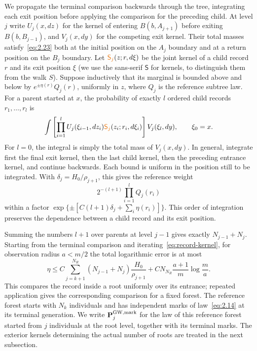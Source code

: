 \documentclass[11pt,letterpaper,reqno]{amsart}
\newif\ifrevmarks \revmarkstrue
\newcommand{\add}[1]{\ifrevmarks\textcolor{revorange}{#1}\else#1\fi}
\newcommand{\ren}[2]{\add{#2}}%
\numberwithin{equation}{section}
\theoremstyle{remark}
\begin{document}
We propagate the terminal comparison backwards through the tree, integrating each exit position before applying the comparison for the preceding child. At level $j$ write $U_j(x,dz)$ for the kernel of entering $B(b,A_{j+1})$ before exiting $B(b,B_{j-1})$, and $V_j(x,dy)$ for the competing exit kernel. Their total masses satisfy~\eqref{eq:2.23} both at the initial position on the $A_j$ boundary and at a return position on the $B_j$ boundary. Let $\ren{S_j}{\mathsf S_j}(z;r,d\xi)$ be the joint kernel of a child record $r$ and its exit position $\xi$\add{ (we use the sans-serif $\mathsf S$ for kernels, to distinguish them from the walk $S$)}. Suppose inductively that its marginal is bounded above and below by $e^{\pm\eta(r)}Q_j(r)$, uniformly in $z$, where $Q_j$ is the reference subtree law. For a parent started at $x$, the probability of exactly $l$ ordered child records $r_1,\ldots,r_l$ is
\begin{equation}\label{eq:record-kernel}
\int\left[\prod_{i=1}^l
U_j(\xi_{i-1},dz_i)\ren{S_j}{\mathsf S_j}(z_i;r_i,d\xi_i)\right]
V_j(\xi_l,dy),\qquad \xi_0=x.
\end{equation}
For $l=0$, the integral is simply the total mass of $V_j(x,dy)$. In general, integrate first the final exit kernel, then the last child kernel, then the preceding entrance kernel, and continue backwards. Each bound is uniform in the position still to be integrated. With $\delta_j=H_0/\rho_{j+1}$, this gives the reference weight
\[
2^{-(l+1)}\prod_{i=1}^lQ_j(r_i)
\]
within a factor $\exp\{\pm[C(l+1)\delta_j+\sum_i\eta(r_i)]\}$. This order of integration preserves the dependence between a child record and its exit position.

Summing the numbers $l+1$ over parents at level $j-1$ gives exactly $N_{j-1}+N_j$. Starting from the terminal comparison and iterating~\eqref{eq:record-kernel}, for observation radius $a<m/2$ the total logarithmic error is at most
\begin{equation}\label{eq:2.24}
\eta\le
C\sum_{j=k+1}^{N_R}(N_{j-1}+N_j)\frac{H_0}{\rho_{j+1}}
+CN_{N_R}\frac{a+1}{m}\log\frac ma.
\end{equation}
This compares the record inside a root uniformly over its entrance; repeated application gives the corresponding comparison for a fixed forest. The reference forest starts with $N_k$ individuals and has independent marks of law~\eqref{eq:2.14} at its terminal generation. \add{We write $\mathbf P_j^{\rm GW,mark}$ for the law of this reference forest started from $j$ individuals at the root level, together with its terminal marks.} The exterior kernels determining the actual number of roots are treated in the next subsection.
\end{document}
